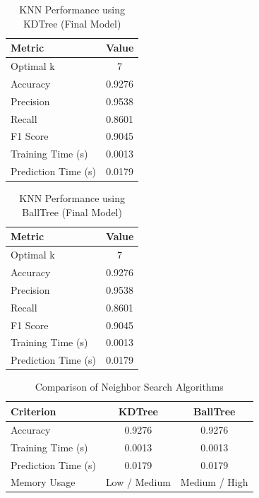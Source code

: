 \documentclass[11pt]{article}
\begin{document}
\begin{table}[H]
\centering
\caption{KNN Performance using KDTree (Final Model)}
\begin{tabular}{|l|c|}
\hline
\textbf{Metric} & \textbf{Value} \\ \hline
Optimal k & 7 \\ \hline
Accuracy & 0.9276 \\ \hline
Precision & 0.9538 \\ \hline
Recall & 0.8601 \\ \hline
F1 Score & 0.9045 \\ \hline
Training Time (s) & 0.0013 \\ \hline
Prediction Time (s) & 0.0179 \\ \hline
\end{tabular}
\end{table}

\begin{table}[H]
\centering
\caption{KNN Performance using BallTree (Final Model)}
\begin{tabular}{|l|c|}
\hline
\textbf{Metric} & \textbf{Value} \\ \hline
Optimal k & 7 \\ \hline
Accuracy & 0.9276 \\ \hline
Precision & 0.9538 \\ \hline
Recall & 0.8601 \\ \hline
F1 Score & 0.9045 \\ \hline
Training Time (s) & 0.0013 \\ \hline
Prediction Time (s) & 0.0179 \\ \hline
\end{tabular}
\end{table}

\begin{table}[H]
\centering
\caption{Comparison of Neighbor Search Algorithms}
\begin{tabular}{|l|c|c|}
\hline
\textbf{Criterion} & \textbf{KDTree} & \textbf{BallTree} \\ \hline
Accuracy & 0.9276 & 0.9276 \\ \hline
Training Time (s) & 0.0013 & 0.0013 \\ \hline
Prediction Time (s) & 0.0179 & 0.0179 \\ \hline
Memory Usage & Low / Medium & Medium / High \\ \hline
\end{tabular}
\end{table}
\end{document}
